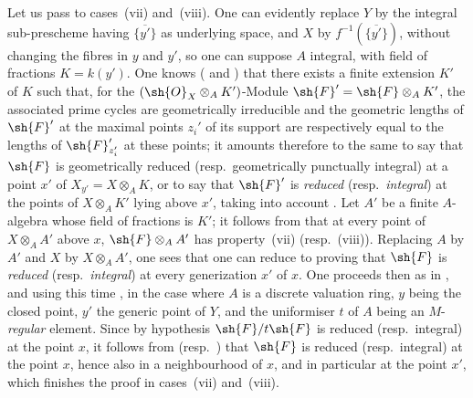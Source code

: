 \begin{env}[12.1.1.3]
\label{IV.12.1.1.3}
Let us pass to cases~(vii) and~(viii).
One can evidently replace $Y$ by the integral sub-prescheme having $\overline{\{y'\}}$ as underlying space, and $X$ by $f^{-1}(\overline{\{y'\}})$, without changing the fibres in $y$ and $y'$, so one can suppose $A$ integral, with field of fractions $K=k(y')$.
One knows ( and ) that there exists a finite extension $K'$ of $K$ such that, for the $(\sh{O}_X\otimes_A K')$-Module $\sh{F}'=\sh{F}\otimes_A K'$, the associated prime cycles are geometrically irreducible and the geometric lengths of $\sh{F}'$ at the maximal points $z_i'$ of its support are respectively equal to the lengths of $\sh{F}'_{z_i'}$ at these points; it amounts therefore to the same to say that $\sh{F}$ is geometrically reduced (resp.\ geometrically punctually integral) at a point $x'$ of $X_{y'}=X\otimes_A K$, or to say that $\sh{F}'$ is \emph{reduced} (resp.\ \emph{integral}) at the points of $X\otimes_A K'$ lying above $x'$, taking into account .
Let $A'$ be a finite $A$-algebra whose field of fractions is $K'$; it follows from  that at every point of $X\otimes_A A'$ above $x$, $\sh{F}\otimes_A A'$ has property~(vii) (resp.~(viii)).
Replacing $A$ by $A'$ and $X$ by $X\otimes_A A'$, one sees that one can reduce to proving that $\sh{F}$ is \emph{reduced} (resp.\ \emph{integral}) at every generization $x'$ of $x$.
One proceeds then as in , and using this time , in the case where $A$ is a discrete valuation ring, $y$ being the closed point, $y'$ the generic point of $Y$, and the uniformiser $t$ of $A$ being an $M$-\emph{regular} element.
Since by hypothesis $\sh{F}/t\sh{F}$ is reduced (resp.\ integral) at the point $x$, it follows from  (resp.\ ) that $\sh{F}$ is reduced (resp.\ integral) at the point $x$, hence also in a neighbourhood of $x$, and in particular at the point $x'$, which finishes the proof in cases~(vii) and~(viii).
\end{env}

